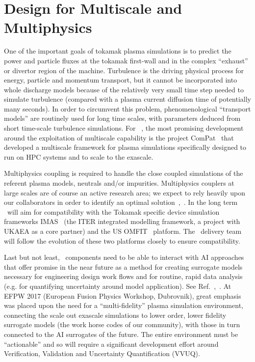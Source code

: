 \documentclass{article}
\begin{document}
\section*{{\Large{}{ \textbf{Design for Multiscale and Multiphysics}}}}

One of the important goals of tokamak plasma simulations is to predict the power 
and particle fluxes at the tokamak first-wall and in the complex ``exhaust'' or 
divertor region of the machine. Turbulence is the driving physical process for 
energy, particle and momentum transport, but it cannot be incorporated into whole 
discharge models because of the relatively very small time step needed to simulate 
turbulence (compared with a plasma current diffusion time of potentially many seconds). 
In order to circumvent this problem, phenomenological ``transport models'' are 
routinely used for long time scales, with parameters deduced from short time-scale 
turbulence simulations. For \nep \  , the most promising development around the 
exploitation of multiscale capability is the project ComPat~\cite{sciplan} that developed 
a multiscale framework for plasma simulations specifically designed to run on HPC 
systems and to scale to the exascale.

Multiphysics coupling is required to handle the close coupled simulations of the 
referent plasma models, neutrals and/or impurities. Multiphysics couplers at large 
scales are of course an active research area; we expect to rely heavily upon our 
collaborators in order to identify an optimal solution~\cite{pappeqs},~\cite{ref [3]}. In the long term 
\nep \   will aim for compatibility with the Tokamak specific device simulation 
frameworks IMAS~\cite{ref [4]} (the ITER integrated modelling framework, a project with UKAEA 
as a core partner) and the US OMFIT~\cite{ref [5]} platform. The \nep \   delivery team will 
follow the evolution of these two platforms closely to ensure compatibility.

Last but not least, \nep \   components need to be able to interact with AI approaches 
that offer promise in the near future as a method for creating surrogate models 
necessary for engineering design work flows and for routine, rapid data analysis 
(e.g. for quantifying uncertainty around model application). See Ref.~\cite{ref [6]},~\cite{ref [7]}. 
At EFPW 2017 (European Fusion Physics Workshop, Dubrovnik), great emphasis was 
placed upon the need for a ``multi-fidelity'' plasma simulation environment, connecting 
the scale out exascale simulations to lower order, lower fidelity surrogate models 
(the work horse codes of our community), with those in turn connected to the AI 
surrogates of the future. The entire environment must be ``actionable'' and so 
will require a significant development effort around Verification, Validation and 
Uncertainty Quantification (VVUQ).
\end{document}
